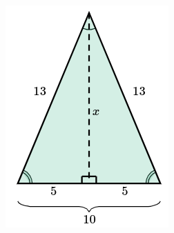 \begin{solutionbox}{15cm}
\begin{minipage}{0.35\textwidth}
\begin{figure}[H]
            \includegraphics[width=0.6\linewidth]{../images/area_isoseles_02b.png}
            \caption{}
            \label{fig:area_isoseles_02b}
        \end{figure}
    \end{minipage}
\end{solutionbox}